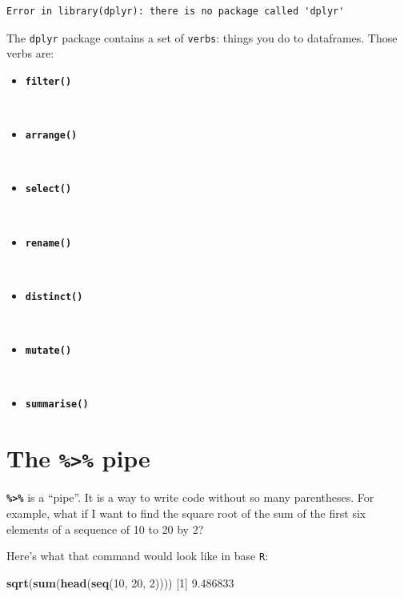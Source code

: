\documentclass[
]{book}
\newenvironment{Shaded}{\begin{snugshade}}{\end{snugshade}}
\newcommand{\DecValTok}[1]{\textcolor[rgb]{0.00,0.00,0.81}{#1}}
\newcommand{\FloatTok}[1]{\textcolor[rgb]{0.00,0.00,0.81}{#1}}
\newcommand{\FunctionTok}[1]{\textcolor[rgb]{0.13,0.29,0.53}{\textbf{#1}}}
\newcommand{\NormalTok}[1]{#1}
\providecommand{\tightlist}{%
  \setlength{\itemsep}{0pt}\setlength{\parskip}{0pt}}
\begin{document}
\begin{verbatim}
Error in library(dplyr): there is no package called 'dplyr'
\end{verbatim}

The \texttt{dplyr} package contains a set of \texttt{verbs}: things you do to dataframes. Those verbs are:

\begin{itemize}
\tightlist
\item
  \textbf{\texttt{filter()}}\strut \\
\item
  \textbf{\texttt{arrange()}}\strut \\
\item
  \textbf{\texttt{select()}}\strut \\
\item
  \textbf{\texttt{rename()}}\strut \\
\item
  \textbf{\texttt{distinct()}}\strut \\
\item
  \textbf{\texttt{mutate()}}\strut \\
\item
  \textbf{\texttt{summarise()}}
\end{itemize}

\section*{\texorpdfstring{The \texttt{\%\textgreater{}\%} pipe}{The \%\textgreater\% pipe}}\label{the-pipe}

\textbf{\texttt{\%\textgreater{}\%}} is a ``pipe''. It is a way to write code without so many parentheses. For example, what if I want to find the square root of the sum of the first six elements of a sequence of 10 to 20 by 2?

Here's what that command would look like in base \texttt{R}:

\begin{Shaded}
\begin{Highlighting}[]
\FunctionTok{sqrt}\NormalTok{(}\FunctionTok{sum}\NormalTok{(}\FunctionTok{head}\NormalTok{(}\FunctionTok{seq}\NormalTok{(}\DecValTok{10}\NormalTok{, }\DecValTok{20}\NormalTok{, }\DecValTok{2}\NormalTok{))))}
\NormalTok{[}\DecValTok{1}\NormalTok{] }\FloatTok{9.486833}
\end{Highlighting}
\end{Shaded}
\end{document}
